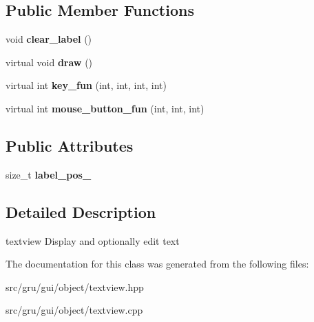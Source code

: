\subsection*{\-Public \-Member \-Functions}
\begin{DoxyCompactItemize}
\item 
\hypertarget{classglutpp_1_1gui_1_1object_1_1textview_a926a96c785895a5c6a5e18c341b3e19f}{void {\bfseries clear\-\_\-label} ()}\label{classglutpp_1_1gui_1_1object_1_1textview_a926a96c785895a5c6a5e18c341b3e19f}

\item 
\hypertarget{classglutpp_1_1gui_1_1object_1_1textview_a535f913bc264bd4bb4072777109a1dc2}{virtual void {\bfseries draw} ()}\label{classglutpp_1_1gui_1_1object_1_1textview_a535f913bc264bd4bb4072777109a1dc2}

\item 
\hypertarget{classglutpp_1_1gui_1_1object_1_1textview_ae100e01abe28a1028432c40a90348b01}{virtual int {\bfseries key\-\_\-fun} (int, int, int, int)}\label{classglutpp_1_1gui_1_1object_1_1textview_ae100e01abe28a1028432c40a90348b01}

\item 
\hypertarget{classglutpp_1_1gui_1_1object_1_1textview_ad4b0c55f05105dc27621052c479956fd}{virtual int {\bfseries mouse\-\_\-button\-\_\-fun} (int, int, int)}\label{classglutpp_1_1gui_1_1object_1_1textview_ad4b0c55f05105dc27621052c479956fd}

\end{DoxyCompactItemize}
\subsection*{\-Public \-Attributes}
\begin{DoxyCompactItemize}
\item 
\hypertarget{classglutpp_1_1gui_1_1object_1_1textview_ad71e0b42f2b9068d6ff72b3b92f6ec3e}{size\-\_\-t {\bfseries label\-\_\-pos\-\_\-}}\label{classglutpp_1_1gui_1_1object_1_1textview_ad71e0b42f2b9068d6ff72b3b92f6ec3e}

\end{DoxyCompactItemize}


\subsection{\-Detailed \-Description}
textview \-Display and optionally edit text 

\-The documentation for this class was generated from the following files\-:\begin{DoxyCompactItemize}
\item 
src/gru/gui/object/textview.\-hpp\item 
src/gru/gui/object/textview.\-cpp\end{DoxyCompactItemize}
